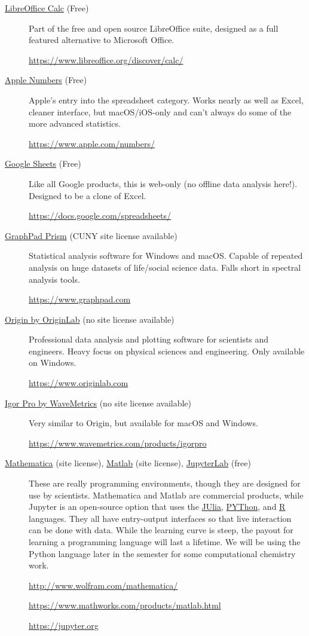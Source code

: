 \documentclass[nobib,nofonts,nols,nohyper]{tufte-handout}
\begin{document}
\begin{description}
	\item [\href{https://www.libreoffice.org/discover/calc/}{LibreOffice Calc} (Free)] Part of the free and open source LibreOffice suite, designed as a full featured alternative to Microsoft Office.
	
	\url{https://www.libreoffice.org/discover/calc/}
	
	\item [\href{https://www.apple.com/numbers/}{Apple Numbers} (Free)] Apple's entry into the spreadsheet category. 
	Works nearly as well as Excel, cleaner interface, but macOS/iOS-only and can't always do some of the more advanced statistics.
	
	\url{https://www.apple.com/numbers/}
	
	\item[\href{https://docs.google.com/spreadsheets/}{Google Sheets} (Free)] Like all Google products, this is web-only (no offline data analysis here!). 
	Designed to be a clone of Excel.
	
	\url{https://docs.google.com/spreadsheets/}
	
	\item[\href{https://www.graphpad.com}{GraphPad Prism} (CUNY site license available)] Statistical analysis software for Windows and macOS. 
	Capable of repeated analysis on huge datasets of life/social science data. 
	Falls short in spectral analysis tools.
	
	\url{https://www.graphpad.com}
	
	\item[\href{https://www.originlab.com}{Origin by OriginLab} (no site license available)] Professional data analysis and plotting software for scientists and engineers. 
	Heavy focus on physical sciences and engineering. 
	Only available on Windows. 
	
	\url{https://www.originlab.com}
	
	\item[\href{https://www.wavemetrics.com/products/igorpro}{Igor Pro by WaveMetrics} (no site license available)] Very similar to Origin, but available for macOS and Windows.
	
	\url{https://www.wavemetrics.com/products/igorpro}
	
	\item[\href{http://www.wolfram.com/mathematica/}{Mathematica} (site license), 
	\href{https://www.mathworks.com/products/matlab.html}{Matlab} (site license), 
	\href{https://jupyter.org}{JupyterLab} (free)] 
	These are really programming environments, though they are designed for use by scientists. Mathematica and Matlab are commercial products, while Jupyter is an open-source option that uses the \href{https://julialang.org}{JUlia},
  \href{https://www.python.org}{PYThon}, and \href{https://www.r-project.org}{R} languages. 
	They all have entry-output interfaces so that live interaction can be done with data. 
	While the learning curve is steep, the payout for learning a programming language will last a lifetime. 
	We will be using the Python language later in the semester for some computational chemistry work.
	
	\url{http://www.wolfram.com/mathematica/}
	
	\url{https://www.mathworks.com/products/matlab.html}
	
	\url{https://jupyter.org}
	
\end{description}
\end{document}
